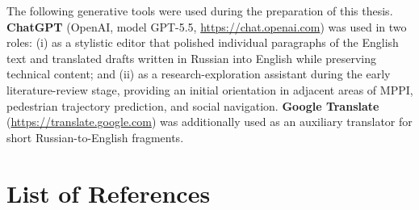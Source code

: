 \documentclass[12pt, a4paper]{article}
\begin{document}
The following generative tools were used during the preparation of this thesis. \textbf{ChatGPT} (OpenAI, model GPT-5.5, \url{https://chat.openai.com}) was used in two roles: (i) as a stylistic editor that polished individual paragraphs of the English text and translated drafts written in Russian into English while preserving technical content; and (ii) as a research-exploration assistant during the early literature-review stage, providing an initial orientation in adjacent areas of MPPI, pedestrian trajectory prediction, and social navigation. \textbf{Google Translate} (\url{https://translate.google.com}) was additionally used as an auxiliary translator for short Russian-to-English fragments.

\newpage
\section*{List of References}
\end{document}
